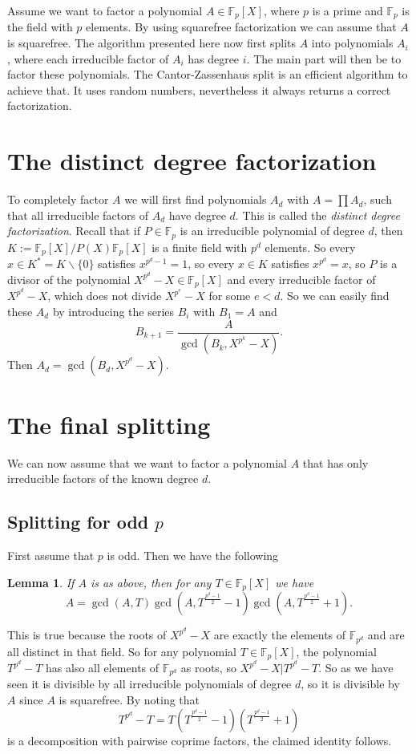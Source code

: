 \documentclass[12pt]{article}
\newtheorem{theorem}{Lemma}
\begin{document}
Assume we want to factor a polynomial $A\in\mathbb{F}_p[X]$, where $p$ is a prime and $\mathbb{F}_p$ is the field with $p$ elements. By using squarefree factorization we can assume that $A$ is squarefree. The algorithm presented here now first splits $A$ into polynomials $A_i$, where each irreducible factor of $A_i$ has degree $i$. The main part will then be to factor these polynomials. The Cantor-Zassenhaus split is an efficient algorithm to achieve that. It uses random numbers, nevertheless it always returns a correct factorization.

\section{The distinct degree factorization}
To completely factor $A$ we will first find polynomials $A_d$ with $A=\prod A_d$, such that all irreducible factors of $A_d$ have degree $d$. This is called the \textit{distinct degree factorization}. Recall that if
$P\in\mathbb{F}_p$ is an irreducible polynomial of degree $d$, then
$K:=\mathbb{F}_p[X]/P(X)\mathbb{F}_p[X]$ is a finite field with $p^d$ elements.
So every $x\in K^*=K\backslash\{0\}$ satisfies $x^{p^d-1}=1$, so every $x\in K$ satisfies 
$x^{p^d}=x$, so $P$ is a divisor of the polynomial $X^{p^d}-X\in\mathbb{F}_p[X]$ and every irreducible factor of $X^{p^d}-X$, which does not divide $X^{p^e}-X$ for some $e<d$. So we can easily find these $A_d$ by introducing the series $B_i$ with $B_1=A$ and 
$$B_{k+1}=\frac{A}{\gcd\left(B_k,X^{p^k}-X\right)}.$$
Then $A_d=\gcd(B_d,X^{p^d}-X)$.

\section{The final splitting}
We can now assume that we want to factor a polynomial $A$ that has only irreducible factors of the known degree $d$. 
\subsection{Splitting for odd $p$}
First assume that $p$ is odd. Then we have the following
\begin{theorem}\label{thm:split.odd}
If $A$ is as above, then for any $T\in\mathbb{F}_p[X]$ we have
$$A=\gcd(A,T)\gcd(A,T^\frac{p^d-1}{2}-1)\gcd(A,T^\frac{p^d-1}{2}+1).$$
\end{theorem}
This is true because the roots of $X^{p^d}-X$ are exactly the elements of $\mathbb{F}_{p^d}$ and are all distinct in that field. So for any polynomial $T\in\mathbb{F}_p[X]$, the polynomial $T^{p^d}-T$ has also all elements of $\mathbb{F}_{p^d}$ as roots, so $X^{p^d}-X|T^{p^d}-T$. So as we have seen it is divisible by all irreducible polynomials of degree $d$, so it is divisible by $A$ since $A$ is squarefree. By noting that
$$T^{p^d}-T=T\left(T^\frac{p^d-1}{2}-1\right)\left(T^\frac{p^d-1}{2}+1\right)$$
is a decomposition with pairwise coprime factors, the claimed identity follows.
\end{document}
